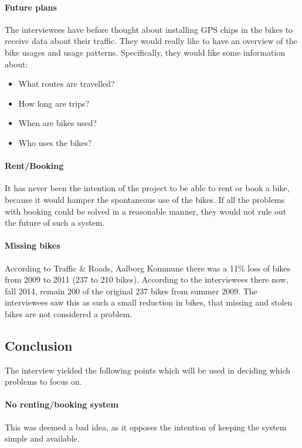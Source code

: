 \paragraph{Future plans}
The interviewees have before thought about installing GPS chips in the bikes to receive data about their traffic.
They would really like to have an overview of the bike usages and usage patterns.
Specifically, they would like some information about:
\begin{itemize}
\item What routes are travelled?
\item How long are trips?
\item When are bikes used?
\item Who uses the bikes?
\end{itemize}

\paragraph{Rent/Booking}
It has never been the intention of the project to be able to rent or book a bike, because it would hamper the spontaneous use of the bikes.
If all the problems with booking could be solved in a reasonable manner, they would not rule out the future of such a system.

\paragraph{Missing bikes}
According to Traffic \& Roads, Aalborg Kommune\cite{cykelplanlaegning} there was a 11\% loss of bikes from 2009 to 2011 (237 to 210 bikes).
According to the interviewees there now, fall 2014, remain 200 of the original 237 bikes from summer 2009.
The interviewees saw this as such a small reduction in bikes, that missing and stolen bikes are not considered a problem.

\subsection{Conclusion}
The interview yielded the following points which will be used in deciding which problems to focus on.

\paragraph{No renting/booking system}
This was deemed a bad idea, as it opposes the intention of keeping the system simple and available.


